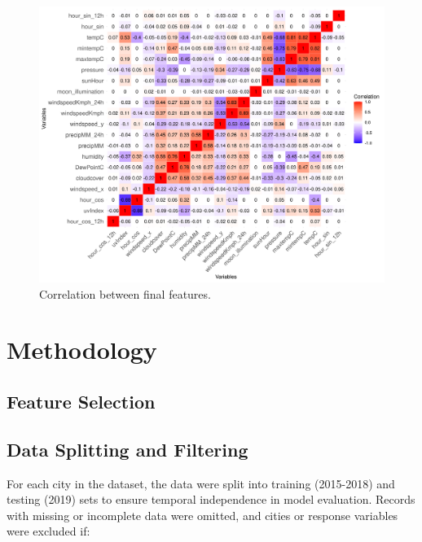 \documentclass[twoside,11pt]{article}
\begin{document}
\begin{figure}[H]
  \centering
  \includegraphics[width=\textwidth]{assets/feature-correlation-matrix-final.png}
  \caption{Correlation between final features.}
  \label{fig:final_feature_correlation}
\end{figure}

\section{Methodology}


\subsection{Feature Selection}


\subsection{Data Splitting and Filtering}

For each city in the dataset, the data were split into training (2015-2018) and testing (2019) sets to ensure temporal independence in model evaluation. Records with missing or incomplete data were omitted, and cities or response variables were excluded if:
\end{document}
